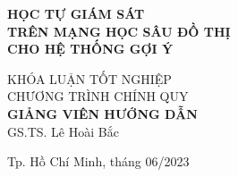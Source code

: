 \begin{titlepage}
\begin{center}


{ \Large \bfseries HỌC TỰ GIÁM SÁT\\TRÊN MẠNG HỌC SÂU ĐỒ THỊ\\CHO HỆ THỐNG GỢI Ý \\[2cm]}  


\large KHÓA LUẬN TỐT NGHIỆP\\
\large CHƯƠNG TRÌNH CHÍNH QUY\\[2cm]

\textbf{GIẢNG VIÊN HƯỚNG DẪN}\\
GS.TS. Lê Hoài Bắc\\



\vfill
Tp. Hồ Chí Minh, tháng 06/2023

\end{center}
\thispagestyle{empty}
\end{titlepage}